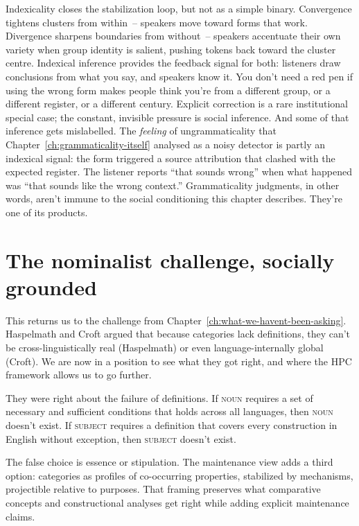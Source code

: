 Indexicality closes the stabilization loop, but not as a simple binary. Convergence tightens clusters from within~-- speakers move toward forms that work. Divergence sharpens boundaries from without~-- speakers accentuate their own variety when group identity is salient, pushing tokens back toward the cluster centre. Indexical inference provides the feedback signal for both: listeners draw conclusions from what you say, and speakers know it. You don't need a red pen if using the wrong form makes people think you're from a different group, or a different register, or a different century. Explicit correction is a rare institutional special case; the constant, invisible pressure is social inference. And some of that inference gets mislabelled. The \emph{feeling} of ungrammaticality that Chapter~\ref{ch:grammaticality-itself} analysed as a noisy detector is partly an indexical signal: the form triggered a source attribution that clashed with the expected register. The listener reports \enquote{that sounds wrong} when what happened was \enquote{that sounds like the wrong context.} Grammaticality judgments, in other words, aren't immune to the social conditioning this chapter describes. They're one of its products.

\section{The nominalist challenge, socially grounded}
\label{sec:16:nominalism-social}

This returns us to the challenge from Chapter~\ref{ch:what-we-havent-been-asking}. Haspelmath and Croft argued that because categories lack definitions, they can't be cross-linguistically real (Haspelmath) or even language-internally global (Croft). We are now in a position to see what they got right, and where the HPC framework allows us to go further.

They were right about the failure of definitions. If \textsc{noun} requires a set of necessary and sufficient conditions that holds across all languages, then \textsc{noun} doesn't exist. If \textsc{subject} requires a definition that covers every construction in English without exception, then \textsc{subject} doesn't exist.

The false choice is essence or stipulation. The maintenance view adds a third option: categories as profiles of co-occurring properties, stabilized by mechanisms, projectible relative to purposes. That framing preserves what comparative concepts and constructional analyses get right while adding explicit maintenance claims.

